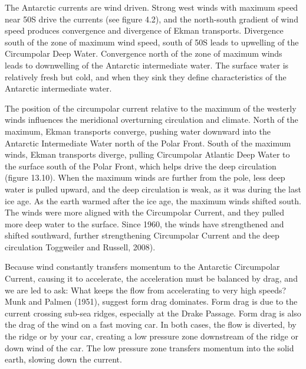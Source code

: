 The Antarctic currents are wind driven. Strong west winds with maximum
speed near 50\degrees S drive the currents (see figure 4.2), and the
north-south gradient of wind speed produces convergence and divergence
of Ekman transports. Divergence south of the
zone of maximum wind speed, south of 50\degrees S leads to
upwelling of the
Circumpolar Deep Water. Convergence north of the zone of maximum winds
leads to downwelling of the Antarctic intermediate water. The surface
water is relatively fresh but cold, and when they sink they define
characteristics of the Antarctic intermediate water.

The position of the circumpolar current relative to the maximum of the
westerly winds influences the meridional overturning circulation and
climate. North of the maximum, Ekman transports converge, pushing water downward into the Antarctic Intermediate
Water north of the Polar Front. South of
the maximum winds, Ekman transports diverge, pulling Circumpolar
Atlantic Deep Water to the surface south of the Polar Front, which
helps drive the deep circulation (figure 13.10). When the maximum
winds are further from the pole, less deep water is pulled upward, and
the deep circulation is weak, as it was during the last ice age. As
the earth warmed after the ice age, the maximum winds shifted
south. The winds were more aligned with the Circumpolar Current, and
they pulled more deep water to the surface. Since 1960, the winds have
strengthened and shifted southward, further strengthening Circumpolar
Current and the deep circulation Toggweiler and Russell, 2008).

Because wind constantly transfers momentum to the Antarctic
Circumpolar Current, causing it
to accelerate, the acceleration must be balanced by drag, and we are
led to ask: What keeps the flow from accelerating to very high speeds?
Munk and Palmen (1951), suggest form drag dominates. Form
drag is due to the current crossing
sub-sea ridges, especially at the Drake Passage. Form drag is also the
drag of the wind on a fast moving car. In both cases, the flow is
diverted, by the ridge or by your car, creating a low pressure zone
downstream of the ridge or down wind of the car. The low pressure zone
transfers momentum into the solid earth, slowing down the current.

